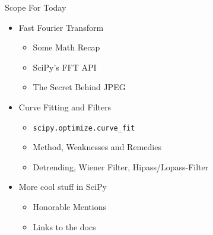 
\begin{frame}[t,plain]
\titlepage
\end{frame}


\begin{frame}{Scope For Today}
%
\begin{itemize}
\item Fast Fourier Transform
	\begin{itemize}
	\item Some Math Recap
	\item SciPy's FFT API
	\item The Secret Behind JPEG
	\end{itemize}
\item Curve Fitting and Filters
	\begin{itemize}
	\item \texttt{scipy.optimize.curve\_fit}
	\item Method, Weaknesses and Remedies
	\item Detrending, Wiener Filter, Hipass/Lopass-Filter
	\end{itemize}
\item More cool stuff in SciPy
	\begin{itemize}
	\item Honorable Mentions
	\item Links to the docs
	\end{itemize}
\end{itemize}
%
\end{frame}


